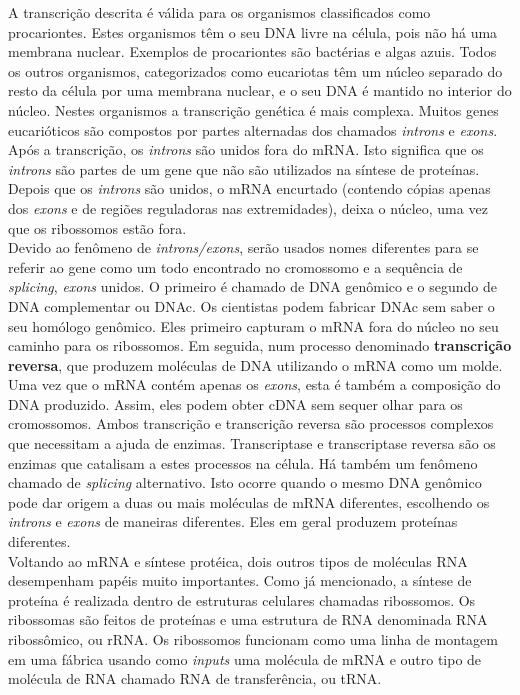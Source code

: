 \indent A transcrição descrita é válida para os organismos classificados como procariontes. Estes organismos têm o seu DNA livre na célula, pois não há uma membrana nuclear. Exemplos de procariontes são bactérias e algas azuis. Todos os outros organismos, categorizados como eucariotas têm um núcleo separado do resto da célula por uma membrana nuclear, e o seu DNA é mantido no interior do núcleo. Nestes organismos a transcrição genética é mais complexa. Muitos genes eucarióticos são compostos por partes alternadas dos chamados \textit{introns} e \textit{exons}. Após a transcrição, os \textit{introns} são unidos fora do mRNA. Isto significa que os \textit{introns} são partes de um gene que não são utilizados na síntese de proteínas. Depois que os \textit{introns} são unidos, o mRNA encurtado (contendo cópias apenas dos \textit{exons} e de regiões reguladoras nas extremidades), deixa o núcleo, uma vez que os ribossomos estão fora. \\

\indent Devido ao fenômeno de \textit{introns/exons}, serão usados nomes diferentes para se referir ao gene como um todo encontrado no cromossomo e a sequência de \textit{splicing}, \textit{exons} unidos. O primeiro é chamado de DNA genômico e o segundo de DNA complementar ou DNAc. Os cientistas podem fabricar DNAc sem saber o seu homólogo genômico. Eles primeiro capturam o mRNA fora do núcleo no seu caminho para os ribossomos. Em seguida, num processo denominado \textbf{transcrição reversa}, que produzem moléculas de DNA utilizando o mRNA como um molde. Uma vez que o mRNA contém apenas os \textit{exons}, esta é também a composição do DNA produzido. Assim, eles podem obter cDNA sem sequer olhar para os cromossomos. Ambos transcrição e transcrição reversa são processos complexos que necessitam a ajuda de enzimas. Transcriptase e transcriptase reversa são os enzimas que catalisam a estes processos na célula. Há também um fenômeno chamado de \textit{splicing} alternativo. Isto ocorre quando o mesmo DNA genômico pode dar origem a duas ou mais moléculas de mRNA diferentes, escolhendo os \textit{introns} e \textit{exons} de maneiras diferentes. Eles em geral produzem proteínas diferentes. \\

\indent Voltando ao mRNA e síntese protéica, dois outros tipos de moléculas RNA desempenham papéis muito importantes. Como já mencionado, a síntese de proteína é realizada dentro de estruturas celulares chamadas ribossomos. Os ribossomas são feitos de proteínas e uma estrutura de RNA denominada RNA ribossômico, ou rRNA. Os ribossomos funcionam como uma linha de montagem em uma fábrica usando como \textit{inputs} uma molécula de mRNA e outro tipo de molécula de RNA chamado RNA de transferência, ou tRNA. \\

